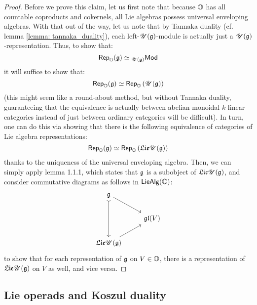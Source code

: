                 \begin{proof}
                    Before we prove this claim, let us first note that because $\mathbb{O}$ has all countable coproducts and cokernels, all Lie algebras possess universal enveloping algebras. With that out of the way, let us note that by Tannaka duality (cf. lemma \ref{lemma: tannaka_duality}), each left-$\mathscr{U}(\mathfrak{g})$-module is actually just a $\mathscr{U}(\mathfrak{g})$-representation. Thus, to show that:
                        $$\mathsf{Rep}_{\mathbb{O}}(\mathfrak{g}) \simeq {}_{\mathscr{U}(\mathfrak{g})}\mathsf{Mod}$$
                    it will suffice to show that:
                        $$\mathsf{Rep}_{\mathbb{O}}(\mathfrak{g}) \simeq \mathsf{Rep}_{\mathbb{O}}\left(\mathscr{U}(\mathfrak{g})\right)$$
                    (this might seem like a round-about method, but without Tannaka duality, guaranteeing that the equivalence is actually between abelian monoidal $k$-linear categories instead of just between ordinary categories will be difficult). In turn, one can do this via showing that there is the following equivalence of categories of Lie algebra representations:
                        $$\mathsf{Rep}_{\mathbb{O}}(\mathfrak{g}) \simeq \mathsf{Rep}_{\mathbb{O}}\left(\mathfrak{Lie} \mathscr{U}(\mathfrak{g})\right)$$
                    thanks to the uniqueness of the universal enveloping algebra. Then, we can simply apply lemma 1.1.1, which states that $\mathfrak{g}$ is a subobject of $\mathfrak{Lie} \mathscr{U}(\mathfrak{g})$, and consider commutative diagrams as follows in $\mathsf{Lie}\mathsf{Alg}(\mathbb{O})$:
                        $$
                            \begin{tikzcd}
                            	{\g} \\
                            	& {\frakgl(V)} \\
                            	{\frakLie \U(\g)}
                            	\arrow[from=1-1, to=2-2]
                            	\arrow[from=3-1, to=2-2]
                            	\arrow[from=1-1, to=3-1, tail]
                            \end{tikzcd}
                        $$
                    to show that for each representation of $\mathfrak{g}$ on $V \in \mathbb{O}$, there is a representation of $\mathfrak{Lie} \mathscr{U}(\mathfrak{g})$ on $V$ as well, and vice versa.
                \end{proof}
                
        \subsection{Lie operads and Koszul duality}
